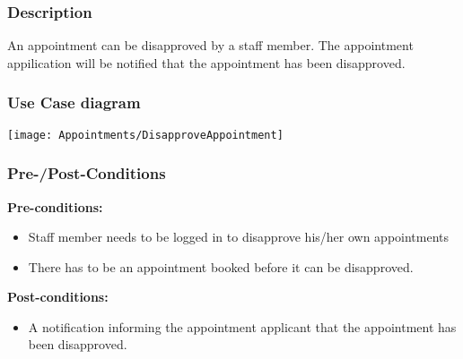\subsubsection{Description}
An appointment can be disapproved by a staff member. The appointment appilication will be notified that the appointment has been disapproved. 

\subsubsection{Use Case diagram}
\texttt{[image: Appointments/DisapproveAppointment]}

\subsubsection{Pre-/Post-Conditions}
\textbf{Pre-conditions:} 
	\begin{itemize}
		\item Staff member needs to be logged in to disapprove his/her own appointments
		\item There has to be an appointment booked before it can be disapproved.
	\end{itemize}
\textbf{ Post-conditions:} 
	\begin{itemize}
		\item A notification informing the appointment applicant that the appointment has been disapproved.
	\end{itemize}	